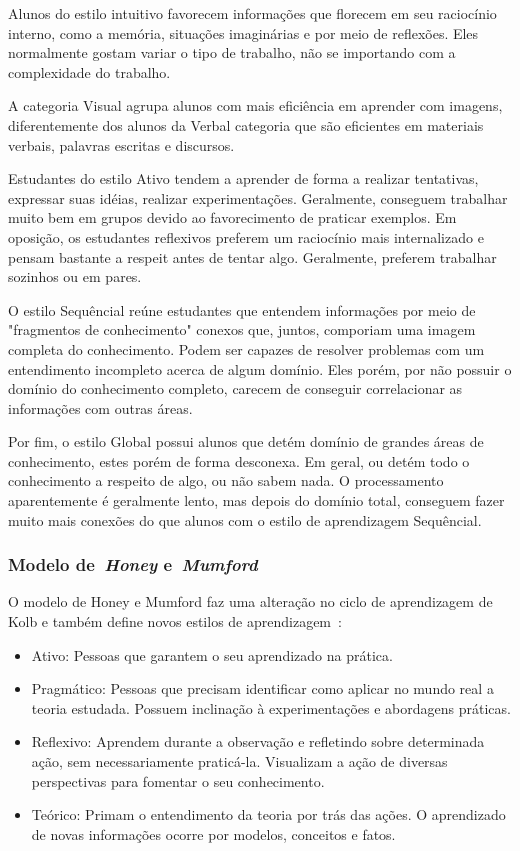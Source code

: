 Alunos do estilo intuitivo favorecem informações que florecem em seu raciocínio interno, como a memória, situações imaginárias e por meio de reflexões. Eles normalmente gostam variar o tipo de trabalho, não se importando com a complexidade do trabalho.

A categoria Visual agrupa alunos com mais eficiência em aprender com imagens, diferentemente dos alunos da Verbal categoria que são eficientes em materiais verbais, palavras escritas e discursos.

Estudantes do estilo Ativo tendem a aprender de forma a realizar tentativas, expressar suas idéias, realizar experimentações. Geralmente, conseguem trabalhar muito bem em grupos devido ao favorecimento de praticar exemplos. Em oposição, os estudantes reflexivos preferem um raciocínio mais internalizado e pensam bastante a respeit antes de tentar algo. Geralmente, preferem trabalhar sozinhos ou em pares.

O estilo Sequêncial reúne estudantes que entendem informações por meio de "fragmentos de conhecimento" conexos que, juntos, comporiam uma imagem completa do conhecimento. Podem ser capazes de resolver problemas com um entendimento incompleto acerca de algum domínio. Eles porém, por não possuir o domínio do conhecimento completo, carecem de conseguir correlacionar as informações com outras áreas.

Por fim, o estilo Global possui alunos que detém domínio de grandes áreas de conhecimento, estes porém de forma desconexa. Em geral, ou detém todo o conhecimento a respeito de algo, ou não sabem nada. O processamento aparentemente é geralmente lento, mas depois do domínio total, conseguem fazer muito mais conexões do que alunos com o estilo de aprendizagem Sequêncial.

\subsubsection{Modelo de~\emph{Honey} e~\emph{Mumford}}
O modelo de Honey e Mumford faz uma alteração no ciclo de aprendizagem de Kolb e também define novos estilos de aprendizagem~\cite{muhlbeier12}:
\begin{itemize}
	\item Ativo: Pessoas que garantem o seu aprendizado na prática.
	\item Pragmático: Pessoas que precisam identificar como aplicar no mundo real a teoria estudada. Possuem inclinação à experimentações e abordagens práticas.
	\item Reflexivo: Aprendem durante a observação e refletindo sobre determinada ação, sem necessariamente praticá-la. Visualizam a ação de diversas perspectivas para fomentar o seu conhecimento.
	\item Teórico: Primam o entendimento da teoria por trás das ações. O aprendizado de novas informações ocorre por modelos, conceitos e fatos.

\end{itemize}

